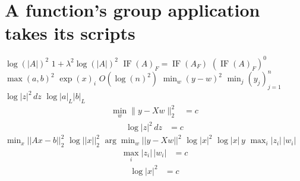 \documentclass{article}
\begin{document}
\section{A function's group application takes its scripts}
$\log(|A|)^{2}$ $1+\lambda^{2}\log(|A|)^{2}$ $\operatorname{IF}(A)_{F}=\operatorname{IF}(A_{F})$ $(\operatorname{IF}(A)_{F})^{0}$
$\max(a,b)^{2}$ $\exp(x)_{i}$ $O(\log(n)^{2})$
$\min_{w}(y-w)^{2}$ $\min_{j}(y_{j})_{j=1}^{n}$
$\log|z|^{2}\,dz$ $\log|a|_{L}|b|_{L}$
\[\begin{split}\min_{w}\|y-Xw\|_{2}^{2}&=c\end{split}\]
\[\begin{split}\log|z|^{2}\,dz&=c\end{split}\]
$\min_{x}||Ax-b||_{2}^{2}$ $\log||x||_{2}^{2}$ $\arg\min_{w}||y-Xw||^{2}$ $\log\lvert x\rvert^{2}$ $\log\lvert x\rvert\,y$ $\max_{i}|z_{i}|\,|w_{i}|$
\[\begin{split}\max_{i}|z_{i}|\,|w_{i}|&=c\end{split}\]
\[\begin{split}\log\lvert x\rvert^{2}&=c\end{split}\]
\end{document}
